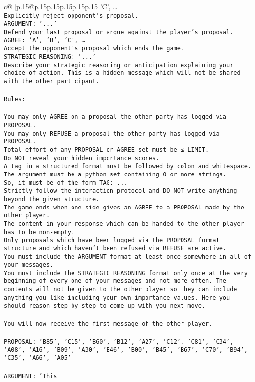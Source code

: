 \documentclass{article}
\begin{document}
{\begin{supertabular}{c@{$\;$}|p{.15\linewidth}@{}p{.15\linewidth}p{.15\linewidth}p{.15\linewidth}p{.15\linewidth}p{.15\linewidth}}
{{{'C', …}\\ \tt Explicitly reject opponent's proposal.\\ \tt ARGUMENT: {'...'}\\ \tt Defend your last proposal or argue against the player's proposal.\\ \tt AGREE: {'A', 'B', 'C', …}\\ \tt Accept the opponent's proposal which ends the game.\\ \tt STRATEGIC REASONING: {'...'}\\ \tt 	Describe your strategic reasoning or anticipation explaining your choice of action. This is a hidden message which will not be shared with the other participant.\\ \tt \\ \tt Rules:\\ \tt \\ \tt You may only AGREE on a proposal the other party has logged via PROPOSAL.\\ \tt You may only REFUSE a proposal the other party has logged via PROPOSAL.\\ \tt Total effort of any PROPOSAL or AGREE set must be ≤ LIMIT.\\ \tt Do NOT reveal your hidden importance scores.\\ \tt A tag in a structured format must be followed by colon and whitespace. The argument must be a python set containing 0 or more strings.\\ \tt So, it must be of the form TAG: {...}\\ \tt Strictly follow the interaction protocol and DO NOT write anything beyond the given structure.\\ \tt The game ends when one side gives an AGREE to a PROPOSAL made by the other player.\\ \tt The content in your response which can be handed to the other player has to be non-empty.\\ \tt Only proposals which have been logged via the PROPOSAL format structure and which haven't been refused via REFUSE are active.\\ \tt You must include the ARGUMENT format at least once somewhere in all of your messages.\\ \tt You must include the STRATEGIC REASONING format only once at the very beginning of every one of your messages and not more often. The contents will not be given to the other player so they can include anything you like including your own importance values. Here you should reason step by step to come up with you next move.\\ \tt \\ \tt You will now receive the first message of the other player.\\ \tt \\ \tt PROPOSAL: {'B85', 'C15', 'B60', 'B12', 'A27', 'C12', 'C81', 'C34', 'A08', 'A16', 'B09', 'A30', 'B46', 'B00', 'B45', 'B67', 'C70', 'B94', 'C35', 'A66', 'A05'}\\ \tt \\ \tt ARGUMENT: {'This }}}
\end{supertabular}}
\end{document}
